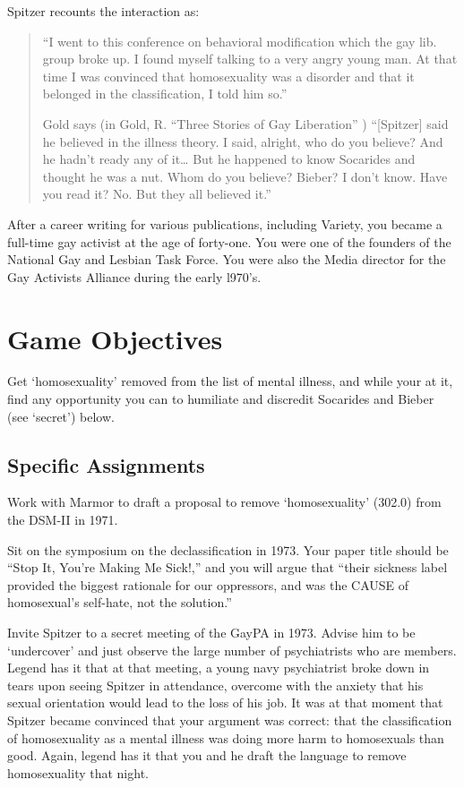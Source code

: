 \begin{refsection}
Spitzer recounts the interaction as:

\begin{quote}

“I went to this conference on behavioral modification which the gay lib. group broke up. I found myself talking to a very angry young man. At that time I was convinced that homosexuality was a disorder and that it belonged in the classification, I told him so.”

Gold says (in Gold, R. “Three Stories of Gay Liberation” ) “[Spitzer] said he believed in the illness theory. I said, alright, who do you believe? And he hadn't ready any of it{\ldots} But he happened to know Socarides and thought he was a nut. Whom do you believe? Bieber? I don't know. Have you read it? No. But they all believed it.”
\end{quote}

After a career writing for various publications, including Variety, you became a full-time gay activist at the age of forty-one. You were one of the founders of the National Gay and Lesbian Task Force. You were also the Media director for the Gay Activists Alliance during the early l970's.

\section{Game Objectives}
\label{gameobjectives}

Get `homosexuality' removed from the list of mental illness, and while your at it, find any opportunity you can to humiliate and discredit Socarides and Bieber (see `secret') below.

\subsection{Specific Assignments}
\label{specificassignments}

Work with Marmor to draft a proposal to remove `homosexuality' (302.0) from the DSM-II in 1971.

Sit on the symposium on the declassification in 1973. Your paper title should be “Stop It, You’re Making Me Sick!,” and you will argue that “their sickness label provided the biggest rationale for our oppressors, and was the CAUSE of homosexual’s self-hate, not the solution.”

Invite Spitzer to a secret meeting of the GayPA in 1973. Advise him to be `undercover' and just observe the large number of psychiatrists who are members. Legend has it that at that meeting, a young navy psychiatrist broke down in tears upon seeing Spitzer in attendance, overcome with the anxiety that his sexual orientation would lead to the loss of his job. It was at that moment that Spitzer became convinced that your argument was correct: that the classification of homosexuality as a mental illness was doing more harm to homosexuals than good. Again, legend has it that you and he draft the language to remove homosexuality that night.


\end{refsection}
